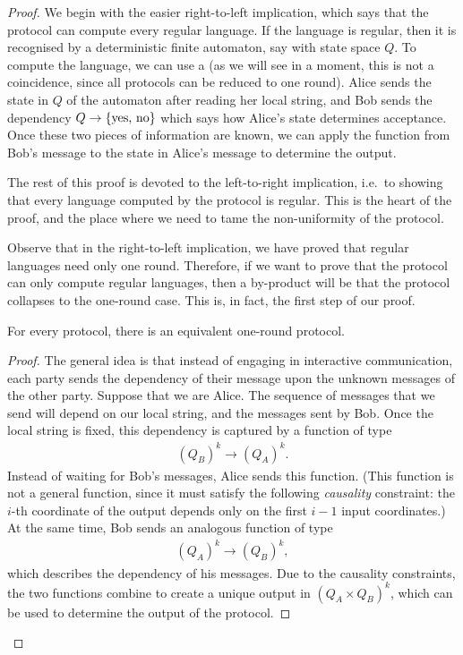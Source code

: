 \begin{proof}
\AP
  We begin with the easier right-to-left implication, which says that the protocol can compute every regular language. If the language is  regular, then it  is recognised by a deterministic finite automaton, say  with state space $Q$. To compute the language, we can use a
   (as we will see in a moment, this is not a coincidence, since all protocols can be reduced to one round). Alice sends the state in $Q$ of the automaton after reading her local string, and Bob sends the dependency $Q \to \{\text{yes, no}\}$ which says how Alice's state determines acceptance. Once these two pieces of information are known, we can apply the function from Bob's message to the state in Alice's message to determine the output.

  The rest of this proof is devoted to the left-to-right implication, i.e.~to showing that every language computed by the protocol is regular. This is the heart of the proof, and the place where we need to tame the non-uniformity of the protocol. 
  
  Observe that in the right-to-left implication, we have proved that regular languages need only one round. Therefore, if we want to  prove that the protocol can only compute regular languages, then a by-product will be that the protocol collapses to the one-round case.  This is, in fact, the first step of our proof. 
  \begin{lemma}\label{lem:one-round-reduction-boolean}
    For every protocol, there is an equivalent one-round protocol. 
  \end{lemma}
  \begin{proof}
    The general idea is that instead of engaging in interactive communication, each party sends the dependency of their message upon the unknown messages of the other party. Suppose that we are  Alice. The sequence of messages that we send will depend on our local string, and  the messages sent by Bob. Once the local string is fixed, this dependency is captured by a function of type 
    \begin{align*}
    (Q_B)^k \to (Q_A)^k.
    \end{align*}
    Instead of waiting for Bob's messages, Alice sends this function. (This function is not a general function, since it must satisfy the following \emph{causality} constraint: the $i$-th coordinate of the output depends only on the first $i-1$ input coordinates.) At the same time, Bob sends an analogous function of type 
    \begin{align*}
    (Q_A)^k \to (Q_B)^k,
    \end{align*}
    which describes the dependency of his messages. Due to the causality constraints, the two functions combine to create a unique output in $(Q_A \times Q_B)^k$, which can be used to determine the output of the protocol.
  \end{proof}


\end{proof}
